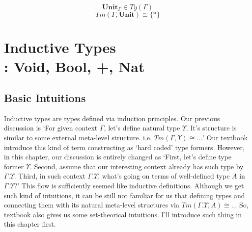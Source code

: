 \documentclass[12pt, a4paper, openany, twoside]{book}
\theoremstyle{definition}
\theoremstyle{remark}
\theoremstyle{plain}
\numberwithin{equation}{section}
\begin{document}
\begin{tcolorbox}[colback=yellow!10!white,colframe=green!75!black,title=Construction 2.5.1.]\hypertarget{const 2.5.1.}{}
\[\mathbf{Unit}_\Gamma \in Ty(\Gamma)\]
\[Tm(\Gamma, \mathbf{Unit}) \cong \{*\}\]
\end{tcolorbox}

\begin{tcolorbox}[colback=yellow!10!white,colframe=green!75!black,title=Construction 2.5.2.]\hypertarget{const 2.5.2.}{}
\end{tcolorbox}
\newpage 
\chapter{Inductive Types \\ : Void, Bool, +, Nat}

\section{Basic Intuitions}

Inductive types are types defined via induction principles. Our previous discussion is \lq For given context $\Gamma$, let's define natural type $\Upsilon$. 
It's structure is similar to some external meta-level structure. i.e. $Tm(\Gamma, \Upsilon) \cong ...$' 
Our textbook introduce this kind of term constructing as \lq hard coded' type formers. 
However, in this chapter, our discussion is entirely changed as \lq First, let's define type former $\Upsilon$. 
Second, assume that our interesting context already has such type by $\Gamma.\Upsilon$. 
Third, in such context $\Gamma.\Upsilon$, what's going on terms of well-defined type $A$ in $\Gamma.\Upsilon$?' 
This flow is sufficiently seemed like inductive definitions. Although we get such kind of intuitions, 
it can be still not familiar for us that defining types and connecting them with its natural meta-level structures via $Tm(\Gamma.\Upsilon, A) \cong ...$
So, textbook also gives us some set-theorical intuitions. I'll introduce such thing in this chapter first. 
\end{document}
